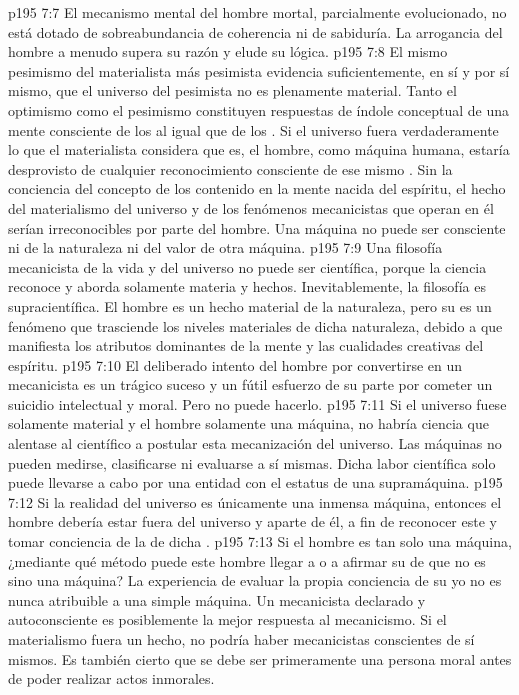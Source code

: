 \vs p195 7:7 El mecanismo mental del hombre mortal, parcialmente evolucionado, no está dotado de sobreabundancia de coherencia ni de sabiduría. La arrogancia del hombre a menudo supera su razón y elude su lógica.
\vs p195 7:8 El mismo pesimismo del materialista más pesimista evidencia suficientemente, en sí y por sí mismo, que el universo del pesimista no es plenamente material. Tanto el optimismo como el pesimismo constituyen respuestas de índole conceptual de una mente consciente de los  al igual que de los . Si el universo fuera verdaderamente lo que el materialista considera que es, el hombre, como máquina humana, estaría desprovisto de cualquier reconocimiento consciente de ese mismo . Sin la conciencia del concepto de los  contenido en la mente nacida del espíritu, el hecho del materialismo del universo y de los fenómenos mecanicistas que operan en él serían irreconocibles por parte del hombre. Una máquina no puede ser consciente ni de la naturaleza ni del valor de otra máquina.
\vs p195 7:9 Una filosofía mecanicista de la vida y del universo no puede ser científica, porque la ciencia reconoce y aborda solamente materia y hechos. Inevitablemente, la filosofía es supracientífica. El hombre es un hecho material de la naturaleza, pero su  es un fenómeno que trasciende los niveles materiales de dicha naturaleza, debido a que manifiesta los atributos dominantes de la mente y las cualidades creativas del espíritu.
\vs p195 7:10 El deliberado intento del hombre por convertirse en un mecanicista es un trágico suceso y un fútil esfuerzo de su parte por cometer un suicidio intelectual y moral. Pero no puede hacerlo.
\vs p195 7:11 Si el universo fuese solamente material y el hombre solamente una máquina, no habría ciencia que alentase al científico a postular esta mecanización del universo. Las máquinas no pueden medirse, clasificarse ni evaluarse a sí mismas. Dicha labor científica solo puede llevarse a cabo por una entidad con el estatus de una supramáquina.
\vs p195 7:12 Si la realidad del universo es únicamente una inmensa máquina, entonces el hombre debería estar fuera del universo y aparte de él, a fin de reconocer este  y tomar conciencia de la  de dicha .
\vs p195 7:13 \pc Si el hombre es tan solo una máquina, ¿mediante qué método puede este hombre llegar a  o a afirmar su  de que no es sino una máquina? La experiencia de evaluar la propia conciencia de su yo no es nunca atribuible a una simple máquina. Un mecanicista declarado y autoconsciente es posiblemente la mejor respuesta al mecanicismo. Si el materialismo fuera un hecho, no podría haber mecanicistas conscientes de sí mismos. Es también cierto que se debe ser primeramente una persona moral antes de poder realizar actos inmorales.
